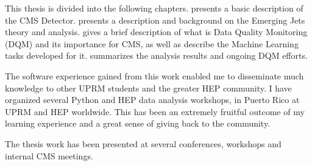This thesis is divided into the following chapters.
 presents a basic description of the CMS Detector.
 presents a description and background on the Emerging Jets theory and analysis.
 gives a brief description of what is Data Quality Monitoring (DQM) and its importance for CMS, as well as describe the Machine Learning tasks developed for it.
 summarizes the analysis results and ongoing DQM efforts.

The software experience gained from this work enabled me to disseminate much knowledge to other UPRM students and the greater HEP community. I have organized several Python and HEP data analysis workshops, in Puerto Rico at UPRM and HEP worldwide. This has been an extremely fruitful outcome of my learning experience and a great sense of giving back to the community.
\cite{carp21,carp22,carp22b,DAFLR,matplot,MLatCROEM23,PythoSeriesBasics,PythoSeriesMatplot,PythoSeriesML,PythoSeriesPandas,UPRM_ML_Undergrad}


The thesis work has been presented at several conferences, workshops and internal CMS meetings.
\cite{physcon,DPF,prism,uprm-fair,root-workshop,pyhep22,newpersp2023,user-meeting2023,ml-hackathon,newpersp2018,prism2019,CUpathways,UMCERN2018}

